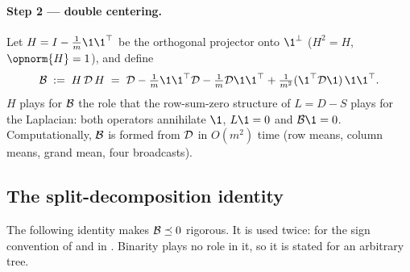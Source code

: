 \paragraph{Step 2 --- double centering.}
Let $H=I-\tfrac1m\1\1^\top$ be the orthogonal projector onto $\1^\perp$
($H^2=H$, $\opnorm{H}=1$), and define
\begin{equation}
   \Bop \;:=\; H\,\Dmat\,H
   \;=\; \Dmat - \tfrac1m\1\1^\top\Dmat - \tfrac1m\Dmat\1\1^\top
        + \tfrac1{m^2}(\1^\top\Dmat\1)\,\1\1^\top.
\end{equation}
$H$ plays for $\mathcal{B}$ the role that the row-sum-zero structure of $L=D-S$ plays
for the Laplacian: both operators annihilate $\1$, $L\1=0$ and $\Bop\1=0$.
Computationally, $\mathcal{B}$ is formed from $\mathcal{D}$ in $O(m^2)$ time (row means,
column means, grand mean, four broadcasts).

\subsection{The split-decomposition identity}\label{app:dist-split}

The following identity makes $\mathcal{B}\preceq0$ rigorous. It is used twice: for the
sign convention of  and in .
Binarity plays no role in it, so it is stated for an arbitrary tree.

